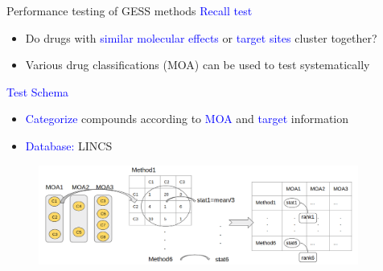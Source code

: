 \documentclass[10pt]{beamer}
\begin{document}
\begin{frame}{Performance testing of GESS methods}
    \textcolor{blue}{Recall test}\\
        \begin{itemize}
            \item Do drugs with \textcolor{blue}{similar molecular effects} or \textcolor{blue}{target sites} cluster together?
            \item Various drug classifications (MOA) can be used to test systematically
        \end{itemize}
    \textcolor{blue}{Test Schema}\\
        \begin{itemize}
            \item \textcolor{blue}{Categorize} compounds according to \textcolor{blue}{MOA} and \textcolor{blue}{target} information
            \item \textcolor{blue}{Database:} LINCS
        \end{itemize}
    \begin{figure}
        \centering
        \includegraphics[width=10.5cm]{demo/images/test_gess.png}
    \end{figure}
\end{frame}
\end{document}
